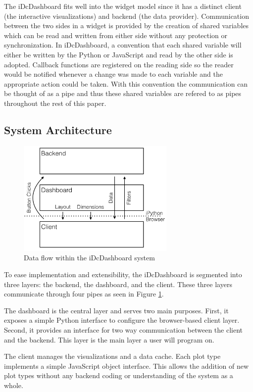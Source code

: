 \documentclass[letter,twocolumn]{article}
\begin{document}
The iDcDashboard fits well into the widget model since it has a distinct client (the interactive visualizations) and backend (the data provider).
Communication between the two sides in a widget is provided by the creation of shared variables which can be read and written from either side without any protection or synchronization.
In iDcDashboard, a convention that each shared variable will either be written by the Python or JavaScript and read by the other side is adopted.
Callback functions are registered on the reading side so the reader would be notified whenever a change was made to each variable and the appropriate action could be taken.
With this convention the communication can be thought of as a pipe and thus these shared variables are refered to as pipes throughout the rest of this paper.

\subsection{System Architecture}
\begin{figure}[htb]
	\begin{center}
	\includegraphics[width=3in]{figs/dataflow.png}
	\end{center}
	\caption{Data flow within the iDcDashboard system}\label{fig:system_flow}
\end{figure}

To ease implementation and extensibility, the iDcDashboard is segmented into three layers: the backend, the dashboard, and the client.
These three layers communicate through four pipes as seen in Figure \ref{fig:system_flow}.

The dashboard is the central layer and serves two main purposes.
First, it exposes a simple Python interface to configure the browser-based client layer.
Second, it provides an interface for two way communication between the client and the backend.
This layer is the main layer a user will program on.

The client manages the visualizations and a data cache.
Each plot type implements a simple JavaScript object interface.
This allows the addition of new plot types without any backend coding or understanding of the system as a whole.
\end{document}
